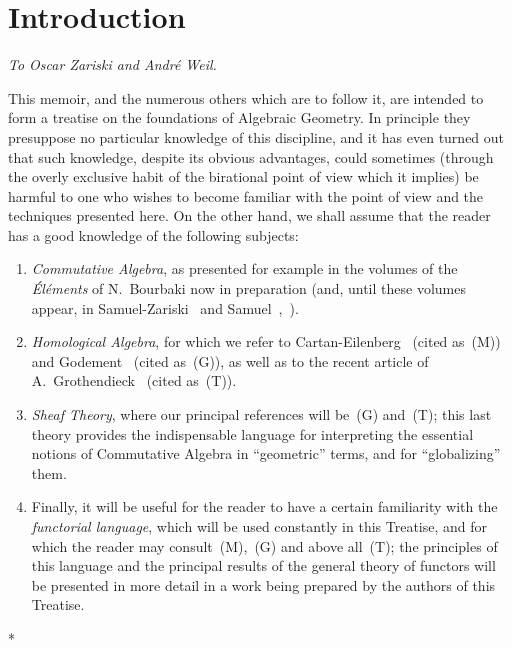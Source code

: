 \section*{Introduction}

\begin{center}
\emph{To Oscar Zariski and André Weil.}
\end{center}


This memoir, and the numerous others which are to follow it, are intended to form a treatise on the foundations of Algebraic Geometry.
In principle they presuppose no particular knowledge of this discipline, and it has even turned out that such knowledge, despite its obvious advantages, could sometimes (through the overly exclusive habit of the birational point of view which it implies) be harmful to one who wishes to become familiar with the point of view and the techniques presented here.
On the other hand, we shall assume that the reader has a good knowledge of the following subjects:

\begin{enumerate}
  \item[\textit{a)}] \emph{Commutative Algebra}, as presented for example in the volumes of the \emph{Éléments} of N.~Bourbaki now in preparation (and, until these volumes appear, in Samuel-Zariski~\cite{I-13} and Samuel~\cite{I-11},~\cite{I-12}).
  \item[\textit{b)}] \emph{Homological Algebra}, for which we refer to Cartan-Eilenberg~\cite{I-2} (cited as~(M)) and Godement~\cite{I-4} (cited as~(G)), as well as to the recent article of A.~Grothendieck~\cite{I-6} (cited as~(T)).
  \item[\textit{c)}] \emph{Sheaf Theory}, where our principal references will be~(G) and~(T); this last theory provides the indispensable language for interpreting the essential notions of Commutative Algebra in ``geometric'' terms, and for ``globalizing'' them.
  \item[\textit{d)}] Finally, it will be useful for the reader to have a certain familiarity with the \emph{functorial language}, which will be used constantly in this Treatise, and for which the reader may consult~(M),~(G) and above all~(T); the principles of this language and the principal results of the general theory of functors will be presented in more detail in a work being prepared by the authors of this Treatise.
\end{enumerate}

\bigskip
\begin{center}*\quad*\quad*\end{center}
\bigskip

